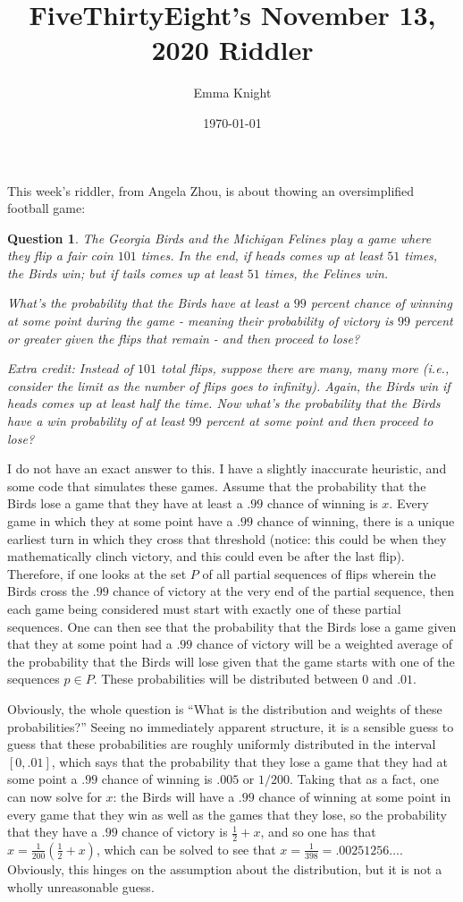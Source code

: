\documentclass[11pt]{article}
\title{FiveThirtyEight's November 13, 2020 Riddler}
\author{Emma Knight}
\date{\today}
\newtheorem{question}[theorem]{Question}
\theoremstyle{definition}
\begin{document}
\maketitle
This week's riddler, from Angela Zhou, is about thowing an oversimplified football game:
\begin{question}
The Georgia Birds and the Michigan Felines play a game where they flip a fair coin $101$ times. In the end, if heads comes up at least $51$ times, the Birds win; but if tails comes up at least $51$ times, the Felines win.

What’s the probability that the Birds have at least a $99$ percent chance of winning at some point during the game - meaning their probability of victory is $99$ percent or greater given the flips that remain - and then proceed to lose?

Extra credit: Instead of $101$ total flips, suppose there are many, many more (i.e., consider the limit as the number of flips goes to infinity). Again, the Birds win if heads comes up at least half the time. Now what’s the probability that the Birds have a win probability of at least $99$ percent at some point and then proceed to lose?
\end{question}
I do not have an exact answer to this.  I have a slightly inaccurate heuristic, and some code that simulates these games.  Assume that the probability that the Birds lose a game that they have at least a $.99$ chance of winning is $x$.  Every game in which they at some point have a $.99$ chance of winning, there is a unique earliest turn in which they cross that threshold (notice: this could be when they mathematically clinch victory, and this could even be after the last flip).  Therefore, if one looks at the set $P$ of all partial sequences of flips wherein the Birds cross the $.99$ chance of victory at the very end of the partial sequence, then each game being considered must start with exactly one of these partial sequences.  One can then see that the probability that the Birds lose a game given that they at some point had a $.99$ chance of victory will be a weighted average of the probability that the Birds will lose given that the game starts with one of the sequences $p \in P$.  These probabilities will be distributed between $0$ and $.01$.

Obviously, the whole question is ``What is the distribution and weights of these probabilities?''  Seeing no immediately apparent structure, it is a sensible guess to guess that these probabilities are roughly uniformly distributed in the interval $[0, .01]$, which says that the probability that they lose a game that they had at some point a $.99$ chance of winning is $.005$ or $1/200$.  Taking that as a fact, one can now solve for $x$: the Birds will have a $.99$ chance of winning at some point in every game that they win as well as the games that they lose, so the probability that they have a $.99$ chance of victory is $\displaystyle{\frac{1}{2} + x}$, and so one has that $x = \displaystyle{\frac{1}{200}\left(\frac{1}{2} + x\right)}$, which can be solved to see that $x = \displaystyle{\frac{1}{398} = .00251256\ldots}$.  Obviously, this hinges on the assumption about the distribution, but it is not a wholly unreasonable guess.
\end{document}

